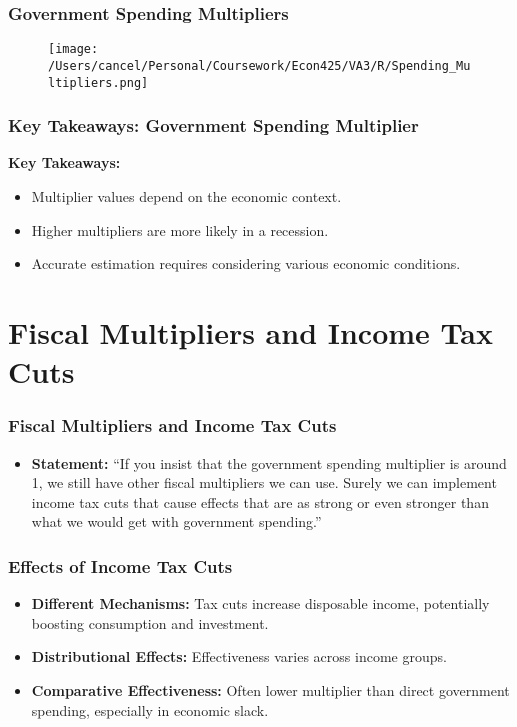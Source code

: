 \documentclass{beamer}
\begin{document}
\begin{frame}
    \frametitle{Government Spending Multipliers}
    \begin{figure}[h!]
        \centering
        \texttt{[image: /Users/cancel/Personal/Coursework/Econ425/VA3/R/Spending\_Multipliers.png]}
    \end{figure}
\end{frame}

\begin{frame}
    \frametitle{Key Takeaways: Government Spending Multiplier}
    \textbf{Key Takeaways:}
    \begin{itemize}
        \item Multiplier values depend on the economic context.
        \item Higher multipliers are more likely in a recession.
        \item Accurate estimation requires considering various economic conditions.
    \end{itemize}
\end{frame}

\section{Fiscal Multipliers and Income Tax Cuts}

\begin{frame}
    \frametitle{Fiscal Multipliers and Income Tax Cuts}
    \begin{itemize}
        \item \textbf{Statement:} ``If you insist that the government spending multiplier is around 1, we still have other fiscal multipliers we can use. Surely we can implement income tax cuts that cause effects that are as strong or even stronger than what we would get with government spending.''
    \end{itemize}
\end{frame}

\begin{frame}
    \frametitle{Effects of Income Tax Cuts}
    \begin{itemize}
        \item \textbf{Different Mechanisms:} Tax cuts increase disposable income, potentially boosting consumption and investment.
        \item \textbf{Distributional Effects:} Effectiveness varies across income groups.
        \item \textbf{Comparative Effectiveness:} Often lower multiplier than direct government spending, especially in economic slack.
    \end{itemize}
\end{frame}
\end{document}
